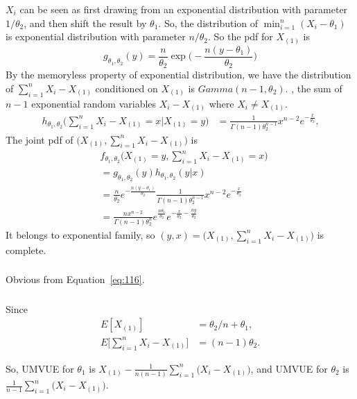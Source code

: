 $X_i$ can be seen as first drawing from an exponential distribution with
parameter $1/\theta_2$,
and then shift the result by $\theta_1$.
So, the distribution of $\min_{i=1}^n(X_i-\theta_1)$ is exponential
distribution with parameter $n/\theta_2$.
So the pdf for $X_{(1)}$ is
\begin{equation}
    g_{\theta_1,\theta_2} (y) = \frac{n}{\theta_2}\exp\bigg(-\frac{n(y-\theta_1)}{\theta_2}\bigg)
\end{equation}
By the memoryless property of exponential distribution,
we have the distribution of $\sum_{i=1}^n X_i-X_{(1)}$
conditioned on $X_{(1)}$ is $Gamma(n-1, \theta_2)$.
\ie, the sum of $n-1$ exponential random variables $X_i-X_{(1)}$ where $X_i\ne X_{(1)}$.
\begin{align}
    h_{\theta_1,\theta_2}\bigg(\sum_{i=1}^n X_i-X_{(1)}=x\bigg|X_{(1)}=y\bigg)
        &= \frac{1}{\Gamma(n-1)\theta_2^{n-1}}x^{n-2} e^{-\frac{x}{\theta_2}}.\label{eq:116}
\end{align}
The joint pdf of  $\big(X_{(1)}, \sum_{i=1}^n X_i-X_{(1)}\big)$ is
\begin{align}
    &f_{\theta_1,\theta_2}\Big(X_{(1)}=y, \sum_{i=1}^n X_i-X_{(1)}=x\Big) \\
        &= g_{\theta_1,\theta_2} (y) h_{\theta_1,\theta_2}(y|x) \\
        &= \frac{n}{\theta_2}e^{-\frac{n(y-\theta_1)}{\theta_2}}
        \frac{1}{\Gamma(n-1)\theta_2^{n-1}}x^{n-2} e^{-\frac{x}{\theta_2}} \\
        &= \frac{nx^{n-2}}{\Gamma(n-1)\theta_2^n}e^{\frac{n\theta_1}{\theta_2}}e^{-\frac{x}{\theta_2}-\frac{ny}{\theta_2}}
\end{align}
It belongs to exponential family,
so $(y, x)=\big(X_{(1)}, \sum_{i=1}^n X_i-X_{(1)}\big)$ is complete.

\subsubsection{} %

Obvious from Equation~\eqref{eq:116}.

\subsubsection{} %

Since
\begin{align}
    E[X_{(1)}] &
        = \theta_2/n + \theta_1, \\
    E\bigg[\sum_{i=1}^n X_i-X_{(1)}\bigg]
        &= (n-1)\theta_2.
\end{align}

So, UMVUE for $\theta_1$ is $X_{(1)} - \frac{1}{n(n-1)}\sum_{i=1}^n\big(X_i-X_{(1)}\big)$,
and UMVUE for $\theta_2$ is $\frac{1}{n-1}\sum_{i=1}^n\big(X_i-X_{(1)}\big)$.
